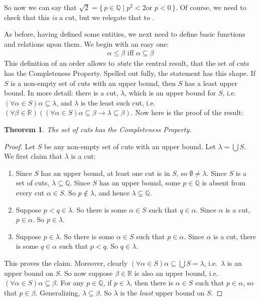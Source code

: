 \documentclass[10pt,a4paper]{article}
\makeatletter
\theoremstyle{plain}
\newtheorem{thm}{Theorem}[section]
\theoremstyle{definition}
\theoremstyle{remark}
\newcommand*{\ollabel}[1]{\label{#1}}
\newcommand{\olref}{\@ifnextchar[{\olref@i}{\olref@final}}
\def\olref@i[#1]{\@ifnextchar[{\olref@ii}{\olref@final}}
\def\olref@ii[#1]{\@ifnextchar[{\olref@iii}{\olref@final}}
\def\olref@iii[#1]{\olref@final}
\def\olref@final#1{\ref{#1}}
\providecommand{\lif}{\mathbin{\rightarrow}}
\providecommand{\Rat}{\mathbb{Q}}
\providecommand{\Real}{\mathbb{R}}
\providecommand{\Setabs}[2]{\{\, #1 \mid #2 \,\}}
\makeatother
\begin{document}
So now we can say that $\sqrt{2} = \Setabs{p \in \Rat}{p^2 < 2\text{
or }p < 0}$. Of course, we need to check that this \emph{is} a cut,
but we relegate that to \olref[check]{sec}.

As before, having defined some entities, we next need to define basic
functions and relations upon them. We begin with an easy one:
\begin{align*}
	\alpha \leq \beta \text{ iff }\alpha \subseteq \beta
\end{align*}
This definition of an order allows to \emph{state} the central result,
that the set of cuts has the Completeness Property. Spelled out fully,
the statement has this shape. If $S$ is a non-empty set of cuts with
an upper bound, then $S$ has a least upper bound. In more detail: there is a cut, $\lambda$, which is an upper bound for $S$, i.e.\ $(\forall \alpha \in S)\alpha \subseteq
\lambda$, and $\lambda$ is the least such cut, i.e.\ $(\forall \beta \in \Real)((\forall \alpha \in S)\alpha \subseteq \beta \lif \lambda \subseteq \beta)$. Now here is
the proof of the result:

\begin{thm}\ollabel{realcompleteness}
The set of cuts has the Completeness Property. 
\end{thm}

\begin{proof}
Let $S$ be any non-empty set of cuts with an upper bound. Let $\lambda
= \bigcup S$. 
We first claim that $\lambda$ is a cut:
\begin{enumerate}
\item Since $S$ has an upper bound, at least one cut is in $S$, so
$\emptyset \neq \lambda$. Since $S$ is a set of cuts, $\lambda
\subseteq \Rat$. Since $S$ has an upper bound, some $p \in \Rat$ is
absent from every cut $\alpha \in S$. So $p\notin \lambda$, and hence
$\lambda \subsetneq \Rat$.
\item Suppose $p < q \in \lambda$. So there is some $\alpha \in S$
such that $q \in \alpha$. Since $\alpha$ is a cut, $p \in \alpha$. So
$p \in \lambda$.
\item Suppose $p \in \lambda$. So there is some $\alpha \in S$ such
that $p \in \alpha$. Since $\alpha$ is a cut, there is some $q \in
\alpha$ such that $p < q$. So $q \in \lambda$. 
\end{enumerate}
This proves the claim. Moreover, clearly $(\forall \alpha \in S)\alpha
\subseteq \bigcup S = \lambda$, i.e.\ $\lambda$ is an upper bound on $S$. So now suppose $\beta \in \mathbb{R}$ is also an upper bound, i.e.\ $(\forall \alpha \in S)\alpha \subseteq \beta$. For any $p \in \Rat$, if $p \in \lambda$, then there is $\alpha \in S$ such that $p \in \alpha$, so that $p \in \beta$. Generalizing, $\lambda \subseteq \beta$. So $\lambda$ is the \emph{least} upper bound on $S$.
\end{proof}
\end{document}
